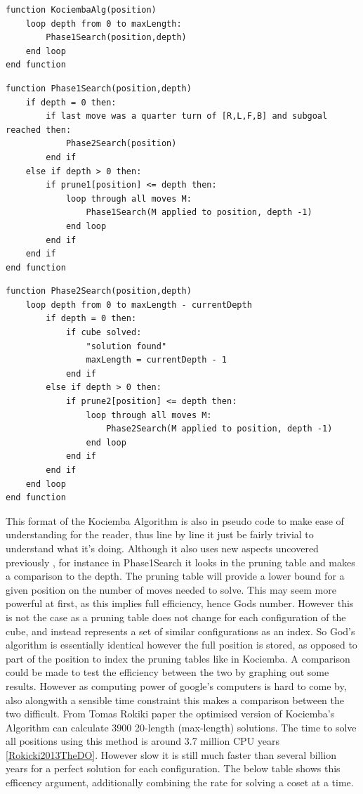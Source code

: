 \documentclass{article}
\begin{document}
\begin{lstlisting}
function KociembaAlg(position)
	loop depth from 0 to maxLength:
		Phase1Search(position,depth)
	end loop
end function
\end{lstlisting}
\begin{lstlisting}
function Phase1Search(position,depth)
	if depth = 0 then:
		if last move was a quarter turn of [R,L,F,B] and subgoal reached then:
			Phase2Search(position)
		end if
	else if depth > 0 then:
		if prune1[position] <= depth then:
			loop through all moves M:
				Phase1Search(M applied to position, depth -1)
			end loop
		end if
	end if
end function
\end{lstlisting}
\begin{lstlisting}
function Phase2Search(position,depth)
	loop depth from 0 to maxLength - currentDepth
		if depth = 0 then:
			if cube solved:
				"solution found"
				maxLength = currentDepth - 1
			end if
		else if depth > 0 then:
			if prune2[position] <= depth then:
				loop through all moves M:
					Phase2Search(M applied to position, depth -1)
				end loop
			end if
		end if
	end loop
end function
\end{lstlisting}
This format of the Kociemba Algorithm is also in pseudo code to make ease of understanding for the reader, thus line by line it just be fairly trivial to understand what it's doing. Although it also uses new aspects uncovered previously , for instance in Phase1Search it looks in the pruning table and makes a comparison to the depth. The pruning table will provide a lower bound for a given position on the number of moves needed to solve. This may seem more powerful at first, as this implies full efficiency, hence Gods number. However this is not the case as a pruning table does not change for each configuration of the cube, and instead represents a set of similar configurations as an index. So God's algorithm is essentially identical however the full position is stored, as opposed to part of the position to index the pruning tables like in Kociemba.\newline
A comparison could be made to test the efficiency between the two by graphing out some results. However as computing power of google's computers is hard to come by, also alongwith a sensible time constraint this makes a comparison between the two difficult. From Tomas Rokiki paper the optimised version of Kociemba's Algorithm can calculate 3900 20-length (max-length) solutions. The time to solve all positions using this method is around 3.7 million CPU years \ref{Rokicki2013TheDO}. However slow it is still much faster than several billion years for a perfect solution for each configuration. The below table shows this efficency argument, additionally combining the rate for solving a coset at a time.
\end{document}
